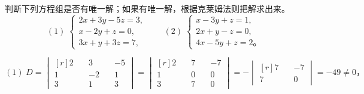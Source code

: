 \liti 判断下列方程组是否有唯一解；如果有唯一解，根据克莱姆法则把解求出来。
$$
(1) \; \begin{cases}
    2x + 3y - 5z = 3, \\
    x - 2y + z = 0, \\
    3x + y + 3z = 7,
\end{cases} \qquad
(2) \; \begin{cases}
    x - 3y + z = 1, \\
    2x + y - z = 0, \\
    4x - 5y + z = 2 \text{。}
\end{cases}
$$

\jie

$
    (1)\; D = \begin{vmatrix*}[r]
        2 \quad & 3  \quad & -5 \\
        1 \quad & -2 \quad & 1 \\
        3 \quad & 1  \quad & 3
    \end{vmatrix*} = \begin{vmatrix*}[r]
        2 \quad & 7 \quad & -7 \\
        1 \quad & 0 \quad & 0 \\
        3 \quad & 7 \quad & 0
    \end{vmatrix*} = - \begin{vmatrix*}[r]
        7 \quad & -7 \\
        7 \quad & 0
    \end{vmatrix*} = -49 \neq 0 \text{，}
$

